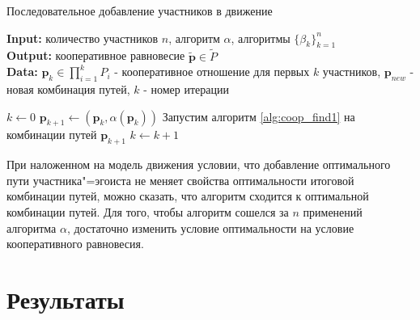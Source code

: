 \documentclass[12pt, a4paper]{article}
\begin{document}
\begin{algorithm}[H]
	\caption{Последовательное добавление участников в движение}
	\label{alg:coop_find2}
	{\bf {Input:}} количество участников $n$, алгоритм $\alpha$, алгоритмы $\{\beta_k\}_{k = 1}^n$\\
	{\bf {Output:}} кооперативное равновесие $\widetilde{\textbf{p}} \in \widetilde{P}$\\
	{\bf {Data:}} $\textbf{p}_{k} \in \prod\limits_{i = 1}^kP_i$ - кооперативное отношение для первых $k$ участников, $\textbf{p}_{new}$ - новая комбинация путей, $k$ - номер итерации
	\begin{algorithmic}[1]
		\State $k \gets 0$
		\State $\textbf{p}_{k + 1} \gets (\textbf{p}_{k}, \alpha (\textbf{p}_{k}))$
		\State Запустим алгоритм \ref {alg:coop_find1} на комбинации путей $\textbf{p}_{k + 1}$
		\State $k \gets k + 1$
		\EndWhile
	\end{algorithmic}
\end{algorithm}

При наложенном на модель движения условии, что добавление оптимального пути участника"=эгоиста не меняет свойства оптимальности итоговой комбинации путей, можно сказать, что алгоритм сходится к оптимальной комбинации путей. Для того, чтобы алгоритм сошелся за $n$ применений алгоритма $\alpha$, достаточно изменить условие оптимальности на условие кооперативного равновесия.


\newpage
\section{Результаты}
\end{document}
